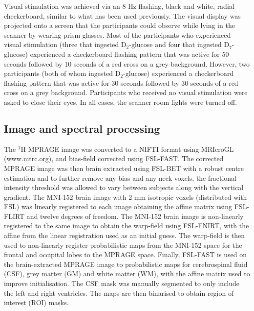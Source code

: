 \documentclass[class=article, crop=false]{standalone}
\begin{document}
Visual stimulation was achieved via an 8 Hz flashing, black and white, radial checkerboard, similar to what has been used previously\cite{Fernandes2020MeasurementT}. The visual display was projected onto a screen that the participants could observe while lying in the scanner by wearing prism glasses. Most of the participants who experienced visual stimulation (three that ingested D$_2$-glucose and four that ingested D$_7$-glucose) experienced a checkerboard flashing pattern that was active for 50 seconds followed by 10 seconds of a red cross on a grey background. However, two participants (both of whom ingested D$_2$-glucose) experienced a checkerboard flashing pattern that was active for 30 seconds followed by 30 seconds of a red cross on a grey background. Participants who received no visual stimulation were asked to close their eyes. In all cases, the scanner room lights were turned off. 


\subsection{Image and spectral processing}

The $^1$H MPRAGE image was converted to a NIFTI format using MRIcroGL (www.nitrc.org), and bias-field corrected using FSL-FAST\cite{Zhang2001SegmentationAlgorithm}. The corrected MPRAGE image was then brain extracted using FSL-BET\cite{Smith2002FastExtraction} with a robust centre estimation and to further remove any bias and any neck voxels, the fractional intensity threshold was allowed to vary between subjects along with the vertical gradient. The MNI-152 brain image with 2 mm isotropic voxels (distributed with FSL\cite{Smith2004AdvancesFSL}) was linearly registered to each image obtaining the affine matrix using FSL-FLIRT\cite{Jenkinson2001AImages, Jenkinson2002ImprovedImages} and twelve degrees of freedom. The MNI-152 brain image is non-linearly registered to the same image to obtain the warp-field using FSL-FNIRT\cite{AnderssonJ2008FNIRT-FMRIBsTool}, with the affine from the linear registration used as an initial guess. The warp-field is then used to non-linearly register probabilistic maps from the MNI-152 space for the frontal and occipital lobes to the MPRAGE space. Finally, FSL-FAST\cite{Zhang2001SegmentationAlgorithm} is used on the brain-extracted MPRAGE image to probabilistic maps for cerebrospinal fluid (CSF), grey matter (GM) and white matter (WM), with the affine matrix used to improve initialisation. The CSF mask was manually segmented to only include the left and right ventricles. The maps are then binarised to obtain region of interest (ROI) masks. 
\end{document}
